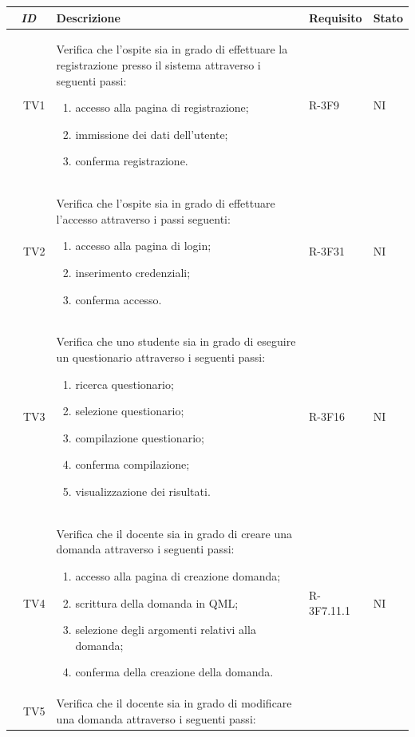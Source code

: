 \documentclass[12pt,a4paper]{article}
\begin{document}
	\begin{longtable}{r l p{10cm} l l}
		\midrule
		\multicolumn{2}{c}{\textbf{\textit{ID}}} & \textbf{Descrizione} & \textbf{Requisito} & \textbf{Stato}\tabularnewline
		\midrule
		\midrule
		& TV1 & Verifica che l'ospite sia in grado di effettuare la registrazione presso il sistema attraverso i seguenti passi:
		
		\begin{enumerate}
			\item accesso alla pagina di registrazione;
			\item immissione dei dati dell'utente;
			\item conferma registrazione.
		\end{enumerate} & R-3F9 & NI\tabularnewline
		\midrule
		& TV2 & Verifica che l'ospite sia in grado di effettuare l'accesso attraverso i passi seguenti:
		
		\begin{enumerate}
			\item accesso alla pagina di login;
			\item inserimento credenziali;
			\item conferma accesso.
		\end{enumerate} & R-3F31 & NI\tabularnewline
		\midrule
		& TV3 & Verifica che uno studente sia in grado di eseguire un questionario attraverso i seguenti passi:
		
		\begin{enumerate}
			\item ricerca questionario;
			\item selezione questionario;
			\item compilazione questionario;
			\item conferma compilazione;
			\item visualizzazione dei risultati.
		\end{enumerate} & R-3F16 & NI\tabularnewline
		\midrule
		& TV4 & Verifica che il docente sia in grado di creare una domanda attraverso i seguenti passi:
		
		\begin{enumerate}
			\item accesso alla pagina di creazione domanda;
			\item scrittura della domanda in QML;
			\item selezione degli argomenti relativi alla domanda;
			\item conferma della creazione della domanda.
		\end{enumerate} & R-3F7.11.1 & NI\tabularnewline
		\midrule
		& TV5 & Verifica che il docente sia in grado di modificare una domanda attraverso i seguenti passi:
		

\end{longtable}
\end{document}
